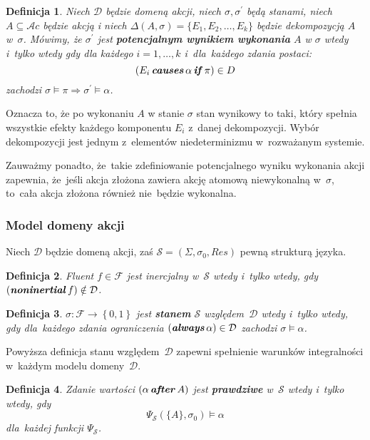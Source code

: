 \documentclass[11pt,a4paper]{article}
\newtheorem{defn}{Definicja}
\DeclareMathOperator{\After}{\textbf{\textit{after}}}
\DeclareMathOperator{\Causes}{\textbf{\textit{causes}}}
\DeclareMathOperator{\If}{\textbf{\textit{if}}}
\DeclareMathOperator{\Always}{\textbf{\textit{always}}}
\DeclareMathOperator{\Noninertial}{\textbf{\textit{noninertial}}}
\begin{document}
\begin{defn}
    \label{defn:potential-execution-result}
    Niech $\mathcal{D}$ będzie domeną akcji, niech $\sigma, \sigma^\prime$ będą stanami, niech $A \subseteq \mathcal{A}c$ będzie akcją i niech $\Delta(A, \sigma) = \{ E_1, E_2, \dots, E_k \}$ będzie dekompozycją $A$ w~$\sigma$.
    Mówimy, że $\sigma^\prime$ jest \textbf{potencjalnym wynikiem wykonania} $A$ w $\sigma$ wtedy i~tylko wtedy gdy dla każdego $i = 1, \dots, k$ i~dla~każdego zdania postaci: 
    $$ (E_i \Causes \alpha \If \pi) \in D $$
    zachodzi $\sigma \models \pi \Rightarrow \sigma^\prime \models \alpha $.
\end{defn} 
    
Oznacza to, że po wykonaniu $A$ w stanie $\sigma$ stan wynikowy to taki, który spełnia wszystkie efekty każdego komponentu $E_i$ z~danej dekompozycji.
Wybór dekompozycji jest jednym z~elementów niedeterminizmu w~rozważanym systemie.

Zauważmy ponadto, że~takie zdefiniowanie potencjalnego wyniku wykonania akcji zapewnia, że~jeśli akcja złożona zawiera akcję atomową niewykonalną w~$\sigma$, to~cała akcja złożona również nie~będzie wykonalna.

\subsubsection{Model domeny akcji}

Niech $\mathcal{D}$ będzie domeną akcji, zaś $\mathcal{S} = \left(\Sigma, \sigma_0, Res\right)$ pewną strukturą języka.

\begin{defn}
    \label{defn:inertial-fluent}
    Fluent $f \in \mathcal{F}$ jest inercjalny w~$\mathcal{S}$ wtedy i~tylko wtedy, gdy $\left(\Noninertial f\right) \notin \mathcal{D}$.
\end{defn}

\begin{defn}
    \label{defn:state-in-domain}
    $\sigma : \mathcal{F} \rightarrow \left\{0,1\right\}$ jest \textbf{stanem} $\mathcal{S}$ względem~$\mathcal{D}$ wtedy i~tylko wtedy, gdy dla~każdego zdania ograniczenia $\left(\Always \alpha\right) \in \mathcal{D}$ zachodzi $\sigma \models \alpha$.
\end{defn}

Powyższa definicja stanu względem~$\mathcal{D}$ zapewni spełnienie warunków integralności w~każdym modelu domeny~$\mathcal{D}$.

\begin{defn}
    \label{defn:value-statement-truth}
    Zdanie wartości $(\alpha \After A)$ jest \textbf{prawdziwe} w~$\mathcal{S}$ wtedy i~tylko wtedy, gdy
    $$\Psi_{\mathcal{S}}(\{ A \}, \sigma_0) \models \alpha$$
    dla~każdej funkcji $\Psi_{\mathcal{S}}$.
\end{defn}
\end{document}
